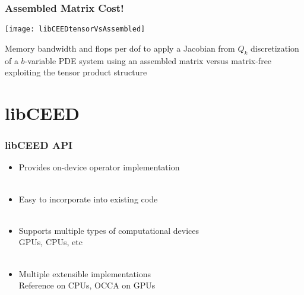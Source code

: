\documentclass{beamer}
\begin{document}

\begin{frame}
\begin{center}
\frametitle{Assembled Matrix Cost!}

\texttt{[image: libCEEDtensorVsAssembled]}

 Memory bandwidth and ﬂops per dof to apply a Jacobian from $Q_k$ discretization of a $b$-variable PDE system using an assembled matrix versus matrix-free exploiting the tensor product structure

\end{center}
\end{frame}

\section{libCEED}

\begin{frame}
\begin{center}
\frametitle{libCEED API}

\begin{itemize}

\item Provides on-device operator implementation\\

~\\

\item Easy to incorporate into existing code\\

~\\

\item Supports multiple types of computational devices\\

\hspace{6mm} GPUs, CPUs, etc\\

~\\

\item Multiple extensible implementations\\

\hspace{6mm} Reference on CPUs, OCCA on GPUs

\end{itemize}

\end{center}
\end{frame}
\end{document}
